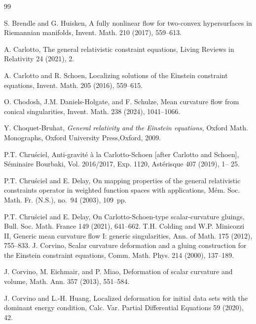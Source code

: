 \documentclass[11pt]{article}
\numberwithin{table}{section}
\numberwithin{equation}{section}
\numberwithin{table}{section}
\numberwithin{figure}{section}
\begin{document}

\begin{thebibliography}{99}

{\sc S. Brendle and G. Huisken,}
A fully nonlinear flow for two-convex hypersurfaces in Riemannian manifolds,
Invent. Math. 210 (2017), 559--613.

{\sc A. Carlotto,}
The general relativistic constraint equations, 
Living Reviews in Relativity 24 (2021), 2. 

{\sc A. Carlotto and R. Schoen,} 
Localizing solutions of the Einstein constraint equations, 
Invent. Math. 205 (2016), 559--615.

{\sc O. Chodosh, J.M. Daniels-Holgate, and F. Schulze,}
Mean curvature flow from conical singularities, 
Invent. Math. 238 (2024), 1041--1066.

{\sc Y. Choquet-Bruhat,}
\emph{General relativity and the Einstein equations,}
Oxford Math. Monographs, Oxford University Press,Oxford, 2009.

{\sc P.T. Chru\'sciel,}
Anti-gravit\'e \`a la Carlotto-Schoen [after Carlotto and Schoen],
S\'eminaire Bourbaki, Vol. 2016/2017, Exp. 1120,  
Ast\'erisque 407 (2019), 1-- 25. 

{\sc P.T. Chru\'sciel and E. Delay,}
On mapping properties of the general relativistic constraints operator in weighted function spaces with applications, 
M\'em. Soc. Math. Fr. (N.S.), no.~94 (2003), 109~pp.

{\sc P.T. Chru\'sciel and E. Delay,}
On Carlotto-Schoen-type scalar-curvature gluings, 
Bull. Soc. Math. France 149 (2021), 641--662. 
% 
{\sc T.H. Colding and W.P. Minicozzi II,}
Generic mean curvature flow I: generic singularities,
Ann. of Math. 175 (2012), 755--833. 
%
{\sc J. Corvino,}
Scalar curvature deformation and a gluing construction for the Einstein constraint equations, 
Comm. Math. Phys. 214 (2000), 137--189. 

{\sc J. Corvino, M. Eichmair, and P. Miao,}
Deformation of scalar curvature and volume, 
Math. Ann. 357 (2013), 551--584.

{\sc J. Corvino and L.-H. Huang,} 
Localized deformation for initial data sets with the dominant energy condition, 
Calc. Var. Partial Differential Equations 59 (2020), 42.


\end{thebibliography}
\end{document}
